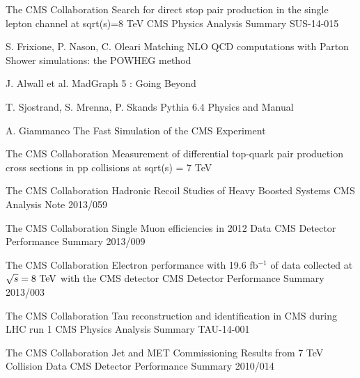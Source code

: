 \begin{thebibliography}{2}
             {The CMS Collaboration}
             {Search for direct stop pair production in the single lepton channel at sqrt(s)=8 TeV}
             {CMS Physics Analysis Summary SUS-14-015}


             {S. Frixione, P. Nason, C. Oleari}
             {Matching NLO QCD computations with Parton Shower simulations: the POWHEG method}
             {}

             {J. Alwall et al.}
             {MadGraph 5 : Going Beyond}
             {}

             {T. Sjostrand, S. Mrenna, P. Skands}
             {Pythia 6.4 Physics and Manual}
             {}

             {A. Giammanco}
             {The Fast Simulation of the CMS Experiment}
             {}

             {The CMS Collaboration}
             {Measurement of differential top-quark pair production
             cross sections in pp collisions at sqrt(s) = 7 TeV}
             {}

             {The CMS Collaboration}
             {Hadronic Recoil Studies of Heavy Boosted Systems}
             {CMS Analysis Note 2013/059}


             {The CMS Collaboration}
             {Single Muon efficiencies in 2012 Data}
             {CMS Detector Performance Summary 2013/009}

             {The CMS Collaboration}
             {Electron performance with 19.6 fb$^{-1}$ of data collected at $\sqrt{s}=8~\text{TeV}$ with the CMS detector}
             {CMS Detector Performance Summary 2013/003}

             {The CMS Collaboration}
             {Tau reconstruction and identification in CMS during LHC run 1}
             {CMS Physics Analysis Summary TAU-14-001}

             {The CMS Collaboration}
             {Jet and MET Commissioning Results from 7 TeV Collision Data}
             {CMS Detector Performance Summary 2010/014}


\end{thebibliography}

